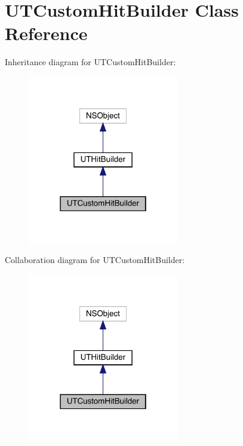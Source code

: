 \hypertarget{interface_u_t_custom_hit_builder}{}\section{U\+T\+Custom\+Hit\+Builder Class Reference}
\label{interface_u_t_custom_hit_builder}


Inheritance diagram for U\+T\+Custom\+Hit\+Builder\+:\nopagebreak
\begin{figure}[H]
\begin{center}
\leavevmode
\includegraphics[width=187pt]{interface_u_t_custom_hit_builder__inherit__graph}
\end{center}
\end{figure}


Collaboration diagram for U\+T\+Custom\+Hit\+Builder\+:\nopagebreak
\begin{figure}[H]
\begin{center}
\leavevmode
\includegraphics[width=187pt]{interface_u_t_custom_hit_builder__coll__graph}
\end{center}
\end{figure}
